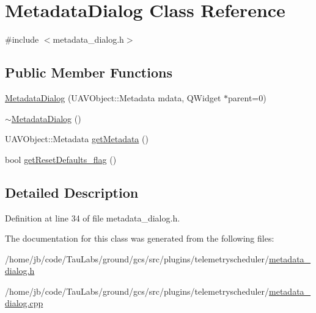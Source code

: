 \hypertarget{class_metadata_dialog}{\section{\-Metadata\-Dialog \-Class \-Reference}
\label{class_metadata_dialog}
}


{\ttfamily \#include $<$metadata\-\_\-dialog.\-h$>$}

\subsection*{\-Public \-Member \-Functions}
\begin{DoxyCompactItemize}
\item 
\hyperlink{group___telemetry_scheduler_gadget_plugin_gae7a09a21f10b02c9cfbeca46cf5f8d3d}{\-Metadata\-Dialog} (\-U\-A\-V\-Object\-::\-Metadata mdata, \-Q\-Widget $\ast$parent=0)
\item 
\hyperlink{group___telemetry_scheduler_gadget_plugin_gae1f623f8f053ac2dc1582cde50cd2d05}{$\sim$\-Metadata\-Dialog} ()
\item 
\-U\-A\-V\-Object\-::\-Metadata \hyperlink{group___telemetry_scheduler_gadget_plugin_ga909d83e32704eef90c21a022a185f359}{get\-Metadata} ()
\item 
bool \hyperlink{group___telemetry_scheduler_gadget_plugin_gac9372736e58b592c6cb67f4c68b3e3ec}{get\-Reset\-Defaults\-\_\-flag} ()
\end{DoxyCompactItemize}


\subsection{\-Detailed \-Description}


\-Definition at line 34 of file metadata\-\_\-dialog.\-h.



\-The documentation for this class was generated from the following files\-:\begin{DoxyCompactItemize}
\item 
/home/jb/code/\-Tau\-Labs/ground/gcs/src/plugins/telemetryscheduler/\hyperlink{metadata__dialog_8h}{metadata\-\_\-dialog.\-h}\item 
/home/jb/code/\-Tau\-Labs/ground/gcs/src/plugins/telemetryscheduler/\hyperlink{metadata__dialog_8cpp}{metadata\-\_\-dialog.\-cpp}\end{DoxyCompactItemize}
